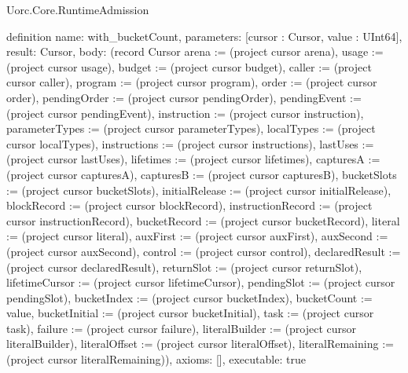 \begin{lexlean}{Uorc.Core.RuntimeAdmission}
\begin{semanticmodule}
definition{
  name: with_bucketCount,
  parameters: [cursor : Cursor, value : UInt64],
  result: Cursor,
  body: (record Cursor {arena := (project cursor arena), usage := (project cursor usage), budget := (project cursor budget), caller := (project cursor caller), program := (project cursor program), order := (project cursor order), pendingOrder := (project cursor pendingOrder), pendingEvent := (project cursor pendingEvent), instruction := (project cursor instruction), parameterTypes := (project cursor parameterTypes), localTypes := (project cursor localTypes), instructions := (project cursor instructions), lastUses := (project cursor lastUses), lifetimes := (project cursor lifetimes), capturesA := (project cursor capturesA), capturesB := (project cursor capturesB), bucketSlots := (project cursor bucketSlots), initialRelease := (project cursor initialRelease), blockRecord := (project cursor blockRecord), instructionRecord := (project cursor instructionRecord), bucketRecord := (project cursor bucketRecord), literal := (project cursor literal), auxFirst := (project cursor auxFirst), auxSecond := (project cursor auxSecond), control := (project cursor control), declaredResult := (project cursor declaredResult), returnSlot := (project cursor returnSlot), lifetimeCursor := (project cursor lifetimeCursor), pendingSlot := (project cursor pendingSlot), bucketIndex := (project cursor bucketIndex), bucketCount := value, bucketInitial := (project cursor bucketInitial), task := (project cursor task), failure := (project cursor failure), literalBuilder := (project cursor literalBuilder), literalOffset := (project cursor literalOffset), literalRemaining := (project cursor literalRemaining)}),
  axioms: [],
  executable: true
}


\end{semanticmodule}
\end{lexlean}
